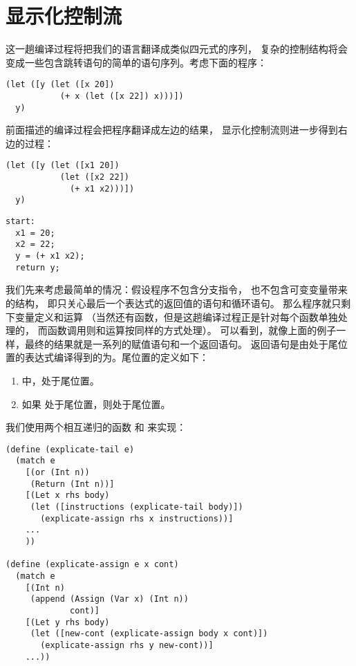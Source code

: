 
\section{显示化控制流}

这一趟编译过程将把我们的语言翻译成类似四元式的序列，
复杂的控制结构将会变成一些包含跳转语句的简单的语句序列。考虑下面的程序：

\begin{lstlisting}
(let ([y (let ([x 20])
           (+ x (let ([x 22]) x)))])
  y)
\end{lstlisting}

前面描述的编译过程会把程序翻译成左边的结果，
显示化控制流则进一步得到右边的过程：

\begin{transformation}
\begin{lstlisting}
(let ([y (let ([x1 20])
           (let ([x2 22])
             (+ x1 x2)))])
  y)
\end{lstlisting}
\compilesto
\begin{lstlisting}
start:
  x1 = 20;
  x2 = 22;
  y = (+ x1 x2);
  return y;
\end{lstlisting}
\end{transformation}

我们先来考虑最简单的情况：假设程序不包含分支指令，
也不包含可变变量带来的结构，
即只关心最后一个表达式的返回值的语句和循环语句。
那么程序就只剩下变量定义和运算
（当然还有函数，但是这趟编译过程正是针对每个函数单独处理的，
而函数调用则和运算按同样的方式处理）。
可以看到，就像上面的例子一样，最终的结果就是一系列的赋值语句和一个返回语句。
返回语句是由处于尾位置的表达式编译得到的为。尾位置的定义如下：

\begin{enumerate}
\item {}中，处于尾位置。
\item 如果  处于尾位置，则处于尾位置。
\end{enumerate}

我们使用两个相互递归的函数 和 来实现：
\begin{lstlisting}
(define (explicate-tail e)
  (match e
    [(or (Int n))
     (Return (Int n))]
    [(Let x rhs body)
     (let ([instructions (explicate-tail body)])
       (explicate-assign rhs x instructions))]
    ...
    ))

(define (explicate-assign e x cont)
  (match e
    [(Int n)
     (append (Assign (Var x) (Int n))
             cont)]
    [(Let y rhs body)
     (let ([new-cont (explicate-assign body x cont)])
       (explicate-assign rhs y new-cont))]
    ...))
\end{lstlisting}

